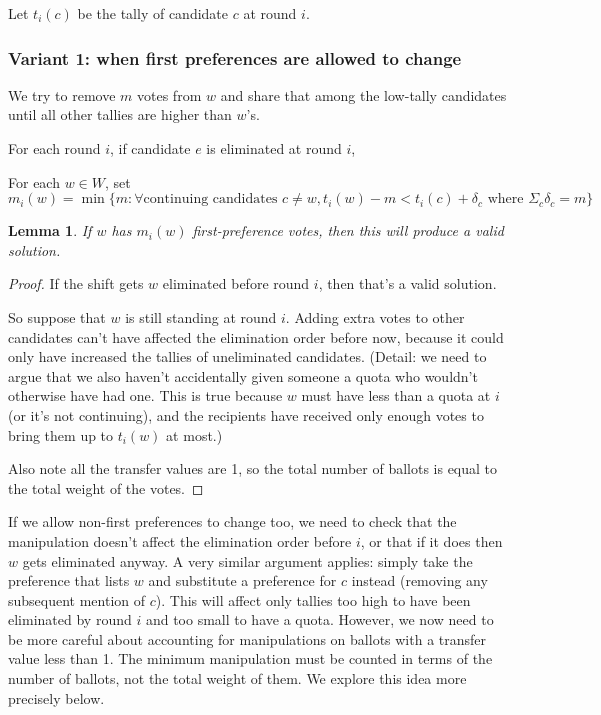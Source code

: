 \documentclass[10pt,a4paper]{article}
\newtheorem{lemma}{Lemma}
\begin{document}
Let $t_i(c)$ be the tally of candidate $c$ at round $i$.

\subsubsection{Variant 1: when first preferences are allowed to change}
We try to remove $m$ votes from $w$ and share that among the low-tally candidates until all other tallies are higher than $w$'s.

For each round $i$, if candidate $e$ is eliminated at round $i$,

For each $w \in W$, set 
\begin{equation} m_i(w) = \min \{m :  \forall \text{continuing candidates }  c \neq w, 
	t_i(w) - m < t_i(c) + \delta_c  \text{ where } \Sigma_c \delta_c = m   \}  
\label{eqn:margin} \end{equation}


\begin{lemma}
If $w$ has $m_i(w)$ first-preference votes, then this will produce a valid solution.  
\end{lemma}
\begin{proof}
If the shift gets $w$ eliminated before round $i$, then that's a valid solution.  

So suppose that $w$ is still standing at round $i$.  Adding extra votes to other candidates can't have affected the elimination order before now, because it could only have increased the tallies of uneliminated candidates.  (Detail: we need to argue that we also haven't accidentally given someone a quota who wouldn't otherwise have had one.  This is true because $w$ must have less than a quota at $i$ (or it's not continuing), and the recipients have received only enough votes to bring them up to $t_i(w)$ at most.)

Also note all the transfer values are 1, so the total number of ballots is equal to the total weight of the votes.
\end{proof}

If we allow non-first preferences to change too, we need to check that the manipulation doesn't affect the elimination order before $i$, or that if it does then $w$ gets eliminated anyway.  A very similar argument applies: simply take the preference that lists $w$ and substitute a preference for $c$ instead (removing any subsequent mention of $c$).  This will affect only tallies too high to have been eliminated by round $i$ and too small to have a quota.  However, we now need to be more careful about accounting for manipulations on ballots with a transfer value less than 1.  The minimum manipulation must be counted in terms of the number of ballots, not the total weight of them.  We explore this idea more precisely below.
\end{document}
